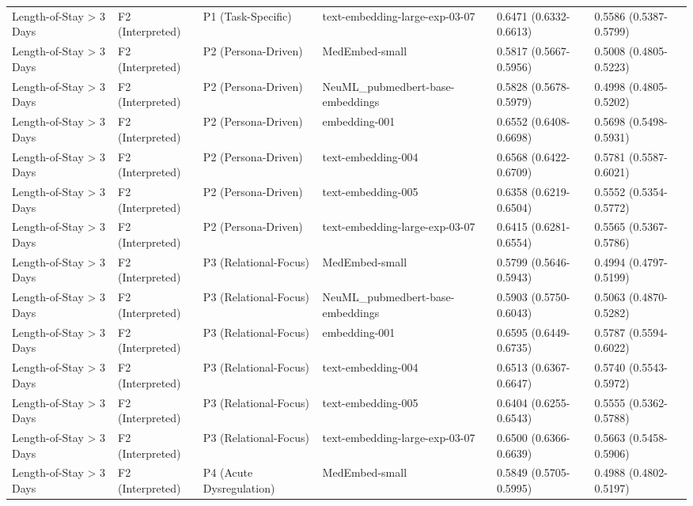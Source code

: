 \begin{tabular}{llllll}
Length-of-Stay \textgreater{} 3 Days & F2 (Interpreted) & P1 (Task-Specific) & text-embedding-large-exp-03-07 & 0.6471 (0.6332-0.6613) & 0.5586 (0.5387-0.5799) \\
Length-of-Stay \textgreater{} 3 Days & F2 (Interpreted) & P2 (Persona-Driven) & MedEmbed-small & 0.5817 (0.5667-0.5956) & 0.5008 (0.4805-0.5223) \\
Length-of-Stay \textgreater{} 3 Days & F2 (Interpreted) & P2 (Persona-Driven) & NeuML\_pubmedbert-base-embeddings & 0.5828 (0.5678-0.5979) & 0.4998 (0.4805-0.5202) \\
Length-of-Stay \textgreater{} 3 Days & F2 (Interpreted) & P2 (Persona-Driven) & embedding-001 & 0.6552 (0.6408-0.6698) & 0.5698 (0.5498-0.5931) \\
Length-of-Stay \textgreater{} 3 Days & F2 (Interpreted) & P2 (Persona-Driven) & text-embedding-004 & 0.6568 (0.6422-0.6709) & 0.5781 (0.5587-0.6021) \\
Length-of-Stay \textgreater{} 3 Days & F2 (Interpreted) & P2 (Persona-Driven) & text-embedding-005 & 0.6358 (0.6219-0.6504) & 0.5552 (0.5354-0.5772) \\
Length-of-Stay \textgreater{} 3 Days & F2 (Interpreted) & P2 (Persona-Driven) & text-embedding-large-exp-03-07 & 0.6415 (0.6281-0.6554) & 0.5565 (0.5367-0.5786) \\
Length-of-Stay \textgreater{} 3 Days & F2 (Interpreted) & P3 (Relational-Focus) & MedEmbed-small & 0.5799 (0.5646-0.5943) & 0.4994 (0.4797-0.5199) \\
Length-of-Stay \textgreater{} 3 Days & F2 (Interpreted) & P3 (Relational-Focus) & NeuML\_pubmedbert-base-embeddings & 0.5903 (0.5750-0.6043) & 0.5063 (0.4870-0.5282) \\
Length-of-Stay \textgreater{} 3 Days & F2 (Interpreted) & P3 (Relational-Focus) & embedding-001 & 0.6595 (0.6449-0.6735) & 0.5787 (0.5594-0.6022) \\
Length-of-Stay \textgreater{} 3 Days & F2 (Interpreted) & P3 (Relational-Focus) & text-embedding-004 & 0.6513 (0.6367-0.6647) & 0.5740 (0.5543-0.5972) \\
Length-of-Stay \textgreater{} 3 Days & F2 (Interpreted) & P3 (Relational-Focus) & text-embedding-005 & 0.6404 (0.6255-0.6543) & 0.5555 (0.5362-0.5788) \\
Length-of-Stay \textgreater{} 3 Days & F2 (Interpreted) & P3 (Relational-Focus) & text-embedding-large-exp-03-07 & 0.6500 (0.6366-0.6639) & 0.5663 (0.5458-0.5906) \\
Length-of-Stay \textgreater{} 3 Days & F2 (Interpreted) & P4 (Acute Dysregulation) & MedEmbed-small & 0.5849 (0.5705-0.5995) & 0.4988 (0.4802-0.5197) \\

\end{tabular}
